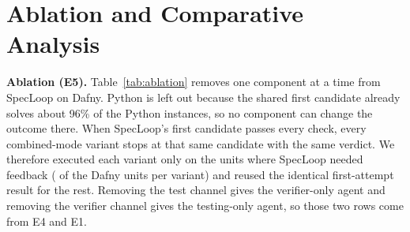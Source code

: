 \section{Ablation and Comparative Analysis}
\label{sec:ablation}

\textbf{Ablation (E5).} Table~\ref{tab:ablation} removes one component at a time from SpecLoop on Dafny. Python is left out because the shared first candidate already solves about 96\% of the Python instances, so no component can change the outcome there. When SpecLoop's first candidate passes every check, every combined-mode variant stops at that same candidate with the same verdict. We therefore executed each variant only on the units where SpecLoop needed feedback ( of the  Dafny units per variant) and reused the identical first-attempt result for the rest. Removing the test channel gives the verifier-only agent and removing the verifier channel gives the testing-only agent, so those two rows come from E4 and E1.

